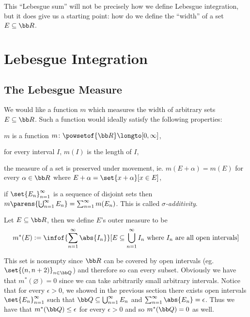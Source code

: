 This ``Lebesgue sum'' will not be precisely how we define Lebesgue integration, but it does give us a starting point: how do we define the ``width'' of a set $E\subseteq{\bb R}$.

\vfill\break

\section{Lebesgue Integration}

\subsection{The Lebesgue Measure}

We would like a function $m$ which measures the width of arbitrary sets $E\subseteq{\bb R}$.
Such a function would ideally satisfy the following properties:
{\def\enumstyle#1{$\m@th\bf(m#1)$}
\benum
    \item $m$ is a function $m\colon\powsetof{\bb R}\longto[0,\infty]$,
    \item for every interval $I$, $m(I)$ is the length of $I$,
    \item the measure of a set is preserved under movement, ie. $m(E+\alpha)=m(E)$ for every $\alpha\in{\bb R}$ where $E+\alpha=\set{x+\alpha}[x\in E]$,
    \item if $\set{E_n}_{n=1}^\infty$ is a sequence of disjoint sets then $m\parens{\bigdcup_{n=1}^\infty E_n}=\sum_{n=1}^\infty m(E_n)$.
        This is called {\it $\sigma$-additivity}.
\eenum}

\bdefn[title=The Outer Measure]

    Let $E\subseteq{\bb R}$, then we define $E$'s {\emphcolor outer measure} to be
    $$ m^*(E) \coloneqq \infof{\sum_{n=1}^\infty\abs{I_n}}[E\subseteq\bigcup_{n=1}^\infty I_n\hbox{ where $I_n$ are all open intervals}] $$

\edefn

This set is nonempty since ${\bb R}$ can be covered by open intervals (eg. $\set{(n,n+2)}_{n\in{\bb Q}}$) and therefore so can every subset.
Obviously we have that $m^*(\varnothing)=0$ since we can take arbitrarily small arbitrary intervals.
Notice that for every $\epsilon>0$, we showed in the previous section there exists open intervals $\set{E_n}_{n=1}^\infty$ such that ${\bb Q}\subseteq\bigcup_{n=1}^\infty E_n$ and
$\sum_{n=1}^\infty\abs{E_n}=\epsilon$.
Thus we have that $m^*({\bb Q})\leq\epsilon$ for every $\epsilon>0$ and so $m^*({\bb Q})=0$ as well.

